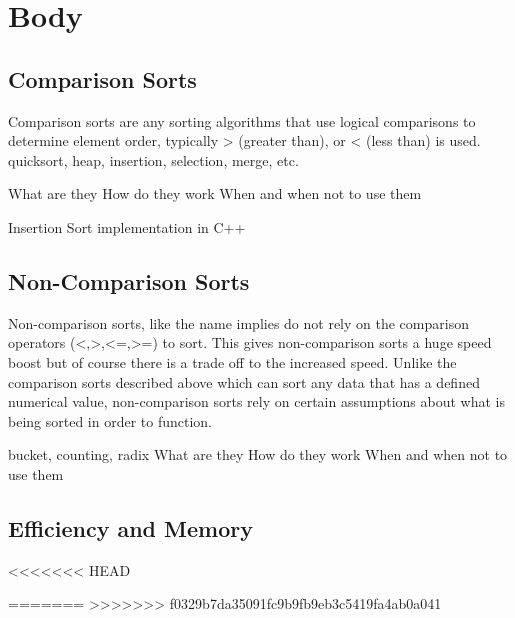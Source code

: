\documentclass[12pt]{article}
\begin{document}
	
	
	
	\section{Body}
	
	\subsection{Comparison Sorts}
	Comparison sorts are any sorting algorithms that use logical comparisons to determine element order, typically > (greater than), or < (less than)  is used.
	quicksort, heap, insertion, selection, merge, etc.
	

	
	What are they
	How do they work
	When and when not to use them
	
	
	
	
	
	
	\begin{Snippet}[h]
		
		\caption[Insertion Sort]{Insertion Sort implementation in C++}	
	\end{Snippet}
	
	
	
	\subsection{Non-Comparison Sorts}
	
	Non-comparison sorts, like the name implies do not rely on the comparison operators (<,>,<=,>=) to sort.
	This gives non-comparison sorts a huge speed boost but of course there is a trade off to the increased speed. 
	Unlike the comparison sorts described above which can sort any data that has a defined numerical value, non-comparison sorts rely on certain assumptions about what is being sorted in order to function.
	
	bucket, counting, radix
	What are they
	How do they work
	When and when not to use them
	
	
	\subsection{Efficiency and Memory}
	
<<<<<<< HEAD


=======
>>>>>>> f0329b7da35091fc9b9fb9eb3c5419fa4ab0a041
	
\end{document}
